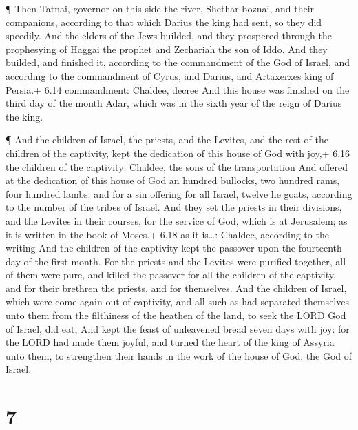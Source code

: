  ¶ Then Tatnai, governor on this side the river,
Shethar-boznai, and their companions, according to that which Darius the
king had sent, so they did speedily.  And the elders of the
Jews builded, and they prospered through the prophesying of Haggai the
prophet and Zechariah the son of Iddo. And they builded, and finished
it, according to the commandment of the God of Israel, and according to
the commandment of Cyrus, and Darius, and Artaxerxes king of Persia.+
6.14 commandment: Chaldee, decree  And this house was
finished on the third day of the month Adar, which was in the sixth year
of the reign of Darius the king.

 ¶ And the children of Israel, the priests, and the
Levites, and the rest of the children of the captivity, kept the
dedication of this house of God with joy,+ 6.16 the children of the
captivity: Chaldee, the sons of the transportation  And
offered at the dedication of this house of God an hundred bullocks, two
hundred rams, four hundred lambs; and for a sin offering for all Israel,
twelve he goats, according to the number of the tribes of Israel.
 And they set the priests in their divisions, and the
Levites in their courses, for the service of God, which is at Jerusalem;
as it is written in the book of Moses.+ 6.18 as it is\ldots: Chaldee,
according to the writing  And the children of the captivity
kept the passover upon the fourteenth day of the first month.
 For the priests and the Levites were purified together,
all of them were pure, and killed the passover for all the children of
the captivity, and for their brethren the priests, and for themselves.
 And the children of Israel, which were come again out of
captivity, and all such as had separated themselves unto them from the
filthiness of the heathen of the land, to seek the LORD God of Israel,
did eat,  And kept the feast of unleavened bread seven days
with joy: for the LORD had made them joyful, and turned the heart of the
king of Assyria unto them, to strengthen their hands in the work of the
house of God, the God of Israel.

\hypertarget{section-6}{%
\section{7}\label{section-6}}

